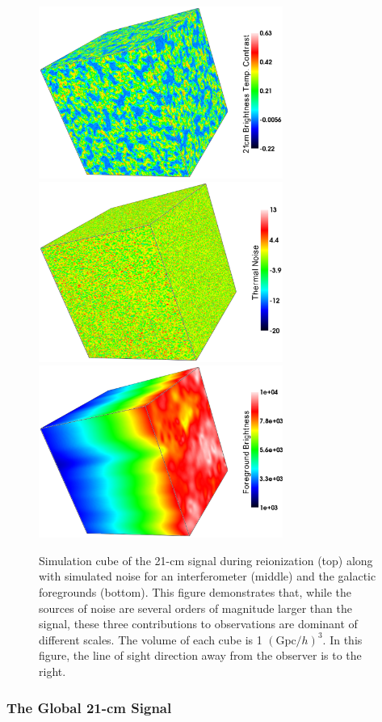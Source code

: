 \begin{figure}[h]
  \centering
  \includegraphics[width=8cm]{TalkSignal.eps}
  \includegraphics[width=8cm]{TalkNoise.eps}
  \includegraphics[width=8cm]{TalkFG.eps}
  \caption{Simulation cube of the 21-cm signal during reionization (top) along with simulated noise for an interferometer (middle) and the galactic foregrounds (bottom). This figure demonstrates that, while the sources of noise are several orders of magnitude larger than the signal, these three contributions to observations are dominant of different scales. The volume of each cube is 1 $(\text{Gpc}/h)^{3}$. In this figure, the line of sight direction away from the observer is to the right. }
  \label{fig:21cmCube}
\end{figure}

\subsubsection{The Global 21-cm Signal}

